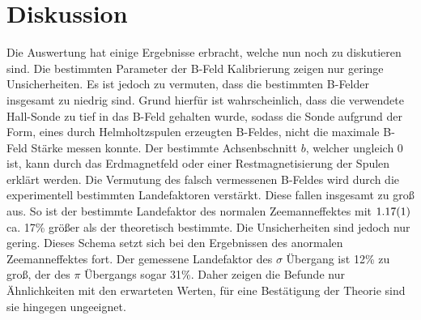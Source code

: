 
\section{Diskussion}
\label{sec:Diskussion}
Die Auswertung hat einige Ergebnisse erbracht, welche nun noch zu diskutieren sind. Die bestimmten Parameter der B-Feld Kalibrierung zeigen nur geringe Unsicherheiten. Es ist jedoch zu vermuten, dass die bestimmten B-Felder insgesamt zu niedrig sind. Grund hierfür ist wahrscheinlich, dass die verwendete Hall-Sonde zu tief in das B-Feld gehalten wurde, sodass die Sonde aufgrund der Form, eines durch Helmholtzspulen erzeugten B-Feldes, nicht die maximale B-Feld Stärke messen konnte. Der bestimmte Achsenbschnitt $b$, welcher ungleich 0 ist, kann durch das Erdmagnetfeld oder einer Restmagnetisierung der Spulen erklärt werden.%
Die Vermutung des falsch vermessenen B-Feldes wird durch die experimentell bestimmten Landefaktoren verstärkt. Diese fallen insgesamt zu groß aus. So ist der bestimmte Landefaktor des normalen Zeemanneffektes mit $\num1.17(1) $ ca. 17\% größer als der theoretisch bestimmte. Die Unsicherheiten sind jedoch nur gering. Dieses Schema setzt sich bei den Ergebnissen des anormalen Zeemanneffektes fort.  Der gemessene Landefaktor des $\sigma$ Übergang ist 12\% zu groß, der des $\pi$ Übergangs sogar 31\%. Daher zeigen die Befunde nur Ähnlichkeiten mit den erwarteten Werten, für eine Bestätigung der Theorie sind sie hingegen ungeeignet.